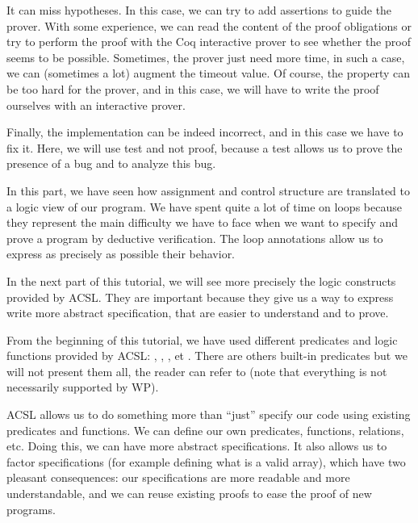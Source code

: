 \documentclass[middle]{zmdocument}
\begin{document}
It can miss hypotheses. In this case, we can try to add assertions to
guide the prover. With some experience, we can read the content of the
proof obligations or try to perform the proof with the Coq interactive
prover to see whether the proof seems to be possible. Sometimes, the
prover just need more time, in such a case, we can (sometimes a lot)
augment the timeout value. Of course, the property can be too hard for
the prover, and in this case, we will have to write the proof ourselves
with an interactive prover.

Finally, the implementation can be indeed incorrect, and in this case we
have to fix it. Here, we will use test and not proof, because a test
allows us to prove the presence of a bug and to analyze this bug.



\horizontalLine



In this part, we have seen how assignment and control structure are translated
to a logic view of our program. We have spent quite a lot of time on loops
because they represent the main difficulty we have to face when we want to
specify and prove a program by deductive verification. The loop annotations
allow us to express as precisely as possible their behavior.



In the next part of this tutorial, we will see more precisely the logic
constructs provided by ACSL. They are important because they give us a way to
express write more abstract specification, that are easier to understand and
to prove.





From the beginning of this tutorial, we have used different predicates
and logic functions provided by ACSL: ,
, ,
 et . There are others
built-in predicates but we will not present them all, the reader can refer to
(note that everything is not necessarily supported by WP).



ACSL allows us to do something more than ``just'' specify our code using
existing predicates and functions. We can define our own predicates,
functions, relations, etc. Doing this, we can have more abstract
specifications. It also allows us to factor specifications (for example
defining what is a valid array), which have two pleasant consequences:
our specifications are more readable and more understandable, and we can
reuse existing proofs to ease the proof of new programs.
\end{document}
